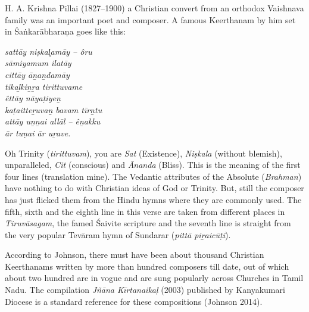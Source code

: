 H. A. Krishna Pillai (1827–1900) a Christian convert from an orthodox Vaishnava family was an important poet and composer. A famous Keerthanam by him set in Śaṅkarābharaṇa goes like this:

\begin{myquote}
\textit{sattāy niṣkal̥amāy – ôru\\ sāmiyamum ilatāy \\ cittāy āṉaṉdamāy\\ tikaḻkiṉṟa tirittuvame\\ êttāy nāyaṭiyeṉ\\ kaṭaitteṟuvaṉ bavam tīrṉtu\\ attāy uṉṉai allāl – êṉakku\\ ār tuṇai ār uṟave.}
\end{myquote}

\begin{myquote}
\end{myquote}

Oh Trinity (\textit{tirittuvam}), you are \textit{Sat} (Existence), \textit{Niṣkala} (without blemish), unparalleled, \textit{Cit} (conscious) and \textit{Ānanda} (Bliss). This is the meaning of the first four lines (translation mine). The Vedantic attributes of the Absolute (\textit{Brahman}) have nothing to do with Christian ideas of God or Trinity. But, still the composer has just flicked them from the Hindu hymns where they are commonly used. The fifth, sixth and the eighth line in this verse are taken from different places in \textit{Tiruvāsagam}, the famed Śaivite scripture and the seventh line is straight from the very popular Tevāram hymn of Sundarar (\textit{pittā piṟaicūṭi}).

According to Johnson, there must have been about thousand Christian Keerthanams written by more than hundred composers till date, out of which about two hundred are in vogue and are sung popularly across Churches in Tamil Nadu. The compilation \textit{Jñāna Kīrtanaikaḷ} (2003) published by Kanyakumari Diocese is a standard reference for these compositions (Johnson 2014).

